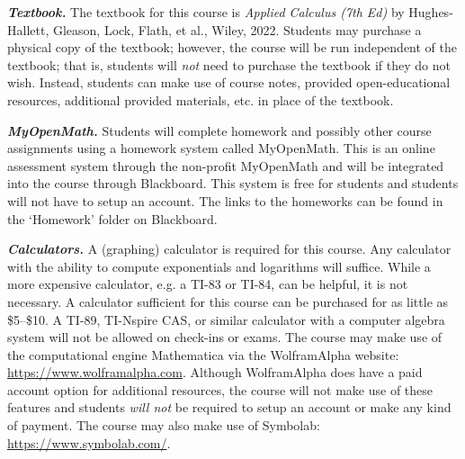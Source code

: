 \documentclass[11pt,letterpaper]{article}
\begin{document}

{\itshape\bfseries\color{scred}Textbook.} The textbook for this course is {\itshape Applied Calculus (7th Ed)} by Hughes-Hallett, Gleason, Lock, Flath, et al., Wiley, 2022. Students may purchase a physical copy of the textbook; however, the course will be run independent of the textbook; that is, students will \textit{not} need to purchase the textbook if they do not wish. Instead, students can make use of course notes, provided open-educational resources, additional provided materials, etc. in place of the textbook. \pspace

{\itshape\bfseries\color{scred}MyOpenMath.} Students will complete homework and possibly other course assignments using a homework system called MyOpenMath. This is an online assessment system through the non-profit MyOpenMath and will be integrated into the course through Blackboard. This system is free for students and students will not have to setup an account. The links to the homeworks can be found in the `Homework' folder on Blackboard. \pspace

{\itshape\bfseries\color{scred}Calculators.} A (graphing) calculator is required for this course. Any calculator with the ability to compute exponentials and logarithms will suffice. While a more expensive calculator, e.g. a TI-83 or TI-84, can be helpful, it is not necessary. A calculator sufficient for this course can be purchased for as little as \$5--\$10. A TI-89, TI-Nspire CAS, or similar calculator with a computer algebra system will not be allowed on check-ins or exams. The course may make use of the computational engine Mathematica via the WolframAlpha website: \url{https://www.wolframalpha.com}. Although WolframAlpha does have a paid account option for additional resources, the course will not make use of these features and students {\itshape will not} be required to setup an account or make any kind of payment. The course may also make use of Symbolab: \url{https://www.symbolab.com/}. 
\sectionbreak



\end{document}

